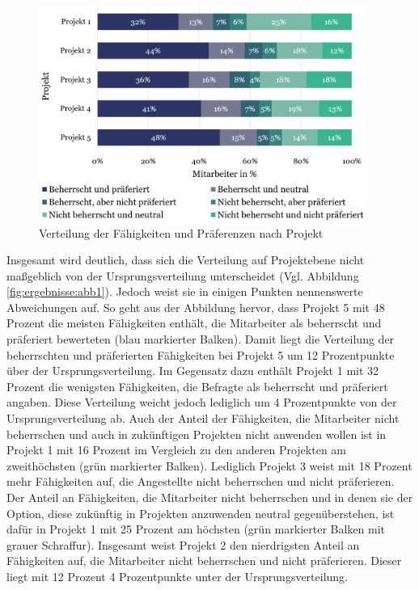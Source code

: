 \begin{figure}
    \centering
	\includegraphics[width=0.95\textwidth]{gfx/verteilung-f-p-nach-projekt.png}
	\caption[Verteilung der Fähigkeiten und Präferenzen nach Projekt]{Verteilung der Fähigkeiten und Präferenzen nach Projekt}
	\label{fig:ergebnisse:abb2}
\end{figure}

Insgesamt wird deutlich, dass sich die Verteilung auf Projektebene nicht maßgeblich von der Ursprungsverteilung unterscheidet (Vgl. Abbildung \ref{fig:ergebnisse:abb1}).
Jedoch weist sie in einigen Punkten nennenswerte Abweichungen auf.
So geht aus der Abbildung hervor, dass Projekt 5 mit 48 Prozent die meisten Fähigkeiten enthält, die Mitarbeiter als beherrscht und präferiert bewerteten (blau markierter Balken).
Damit liegt die Verteilung der beherrschten und präferierten Fähigkeiten bei Projekt 5 um 12 Prozentpunkte über der Ursprungsverteilung.
Im Gegensatz dazu enthält Projekt 1 mit 32 Prozent die wenigsten Fähigkeiten, die Befragte als beherrscht und präferiert angaben.
Diese Verteilung weicht jedoch lediglich um 4 Prozentpunkte von der Ursprungsverteilung ab.
Auch der Anteil der Fähigkeiten, die Mitarbeiter nicht beherrschen und auch in zukünftigen Projekten nicht anwenden wollen ist in Projekt 1 mit 16 Prozent im Vergleich zu den anderen Projekten am zweithöchsten (grün markierter Balken).
Lediglich Projekt 3 weist mit 18 Prozent mehr Fähigkeiten auf, die Angestellte nicht beherrschen und nicht präferieren.
Der Anteil an Fähigkeiten, die Mitarbeiter nicht beherrschen und in denen sie der Option, diese zukünftig in Projekten anzuwenden neutral gegenüberstehen, ist dafür in Projekt 1 mit 25 Prozent am höchsten (grün markierter Balken mit grauer Schraffur).
Insgesamt weist Projekt 2 den nierdrigsten Anteil an Fähigkeiten auf, die Mitarbeiter nicht beherrschen und nicht präferieren.
Dieser liegt mit 12 Prozent 4 Prozentpunkte unter der Ursprungsverteilung.

